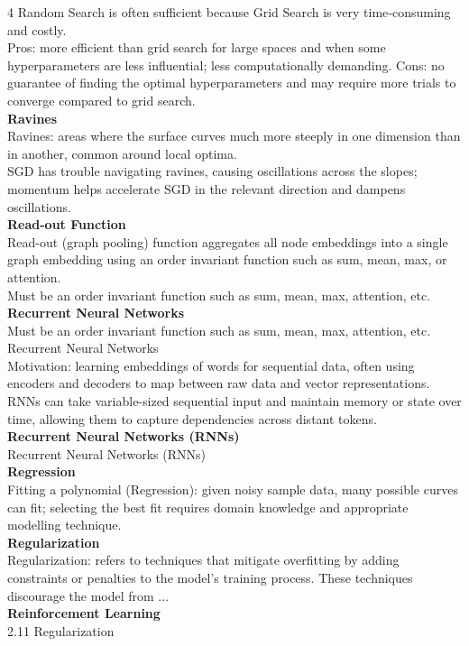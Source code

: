 \documentclass[8pt]{extarticle}
\begin{document}
\begin{multicols}{4}
Random Search is often sufficient because Grid Search is very time‑consuming and costly.\\
Pros: more efficient than grid search for large spaces and when some hyperparameters are less influential; less computationally demanding. Cons: no guarantee of finding the optimal hyperparameters and may require more trials to converge compared to grid search.\\
\vspace{2pt}\textbf{Ravines}\\
Ravines: areas where the surface curves much more steeply in one dimension than in another, common around local optima.\\
SGD has trouble navigating ravines, causing oscillations across the slopes; momentum helps accelerate SGD in the relevant direction and dampens oscillations.\\
\vspace{2pt}\textbf{Read-out Function}\\
Read-out (graph pooling) function aggregates all node embeddings into a single graph embedding using an order invariant function such as sum, mean, max, or attention.\\
Must be an order invariant function such as sum, mean, max, attention, etc.\\
\vspace{2pt}\textbf{Recurrent Neural Networks}\\
Must be an order invariant function such as sum, mean, max, attention, etc.\\
Recurrent Neural Networks\\
Motivation: learning embeddings of words for sequential data, often using encoders and decoders to map between raw data and vector representations.\\
RNNs can take variable-sized sequential input and maintain memory or state over time, allowing them to capture dependencies across distant tokens.\\
\vspace{2pt}\textbf{Recurrent Neural Networks (RNNs)}\\
Recurrent Neural Networks (RNNs)\\
\vspace{2pt}\textbf{Regression}\\
Fitting a polynomial (Regression): given noisy sample data, many possible curves can fit; selecting the best fit requires domain knowledge and appropriate modelling technique.\\
\vspace{2pt}\textbf{Regularization}\\
Regularization: refers to techniques that mitigate overfitting by adding constraints or penalties to the model’s training process. These techniques discourage the model from ...\\
\vspace{2pt}\textbf{Reinforcement Learning}\\
2.11 Regularization\\


\end{multicols}
\end{document}
